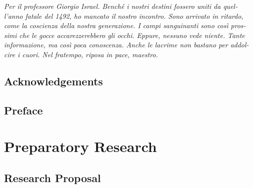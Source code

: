 \documentclass[draft=false, paper=A4,portrait,twoside=true,twocolumn=false,headinclude=false,footinclude=false,fontsize=11,BCOR=15mm,DIV=calc,pagesize=auto,titlepage=firstiscover,mpinclude=true,headings=big,headings=twolinechapter,open=right,chapterprefix=false,headsepline=false,parskip=full]{scrbook}
\begin{document}
\newpage 

\begin{FlushRight}
\begin{italian}
\textit{Per il professore Giorgio Israel. \newline Benché i nostri destini fossero uniti da quell'anno fatale del 1492, \linebreak ho mancato il nostro incontro. \linebreak Sono arrivato in ritardo, come la coscienza della nostra generazione. \linebreak I campi sanguinanti sono così prossimi \linebreak che le gocce accarezzerebbero gli occhi. \linebreak Eppure, nessuno vede niente. \linebreak Tante informazione, ma così poca conoscenza. \linebreak Anche le lacrime non bastano per addolcire i cuori. \linebreak Nel fratempo, riposa in pace, maestro.}
\end{italian}
\end{FlushRight}

\newpage
\tableofcontents 

\frontmatter
\pagestyle{plain}
\chapter{Acknowledgements} 

\lipsum

\chapter{Preface} 

\mainmatter
\pagestyle{scrheadings}
\part{Preparatory Research}
\label{sec:orga9fecd7}
\chapter{Research Proposal}
\label{sec:org0642e8f}
\end{document}
